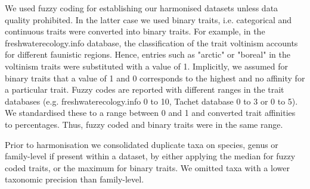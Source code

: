 \documentclass{article}
\begin{document}
We used fuzzy coding for establishing our harmonised datasets unless data quality prohibited. In the latter case we used binary traits, i.e. categorical and continuous traits were converted into binary traits. For example, in the  freshwaterecology.info database, the classification of the trait voltinism accounts for different faunistic regions. Hence, entries such as "arctic" or "boreal" in the voltinism traits were substituted with a value of 1. Implicitly, we assumed for binary traits that a value of 1 and 0 corresponds to the highest and no affinity for a particular trait. Fuzzy codes are reported with different ranges in the trait databases (e.g. freshwaterecology.info 0 to 10, Tachet database 0 to 3 or 0 to 5). We standardised these to a range between 0 and 1 and converted trait affinities to percentages. Thus, fuzzy coded and binary traits were in the same range. 

Prior to harmonisation we consolidated duplicate taxa on species, genus or family-level if present within a dataset, by either applying the median for fuzzy coded traits, or the maximum for binary traits. We omitted taxa with a lower taxonomic precision than family-level.
\end{document}
